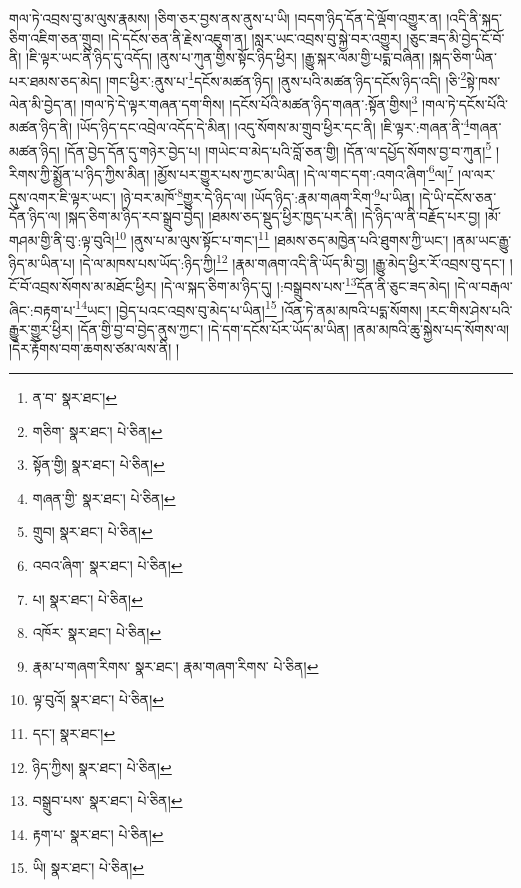 གལ་ཏེ་འབྲས་བུ་མ་ལུས་རྣམས། །ཅིག་ཅར་བྱས་ནས་ནུས་པ་ཡི། །བདག་ཉིད་དོན་དེ་ལྡོག་འགྱུར་ན། །འདི་ནི་སྐད་ཅིག་འཇིག་ཅན་གྲུབ། །དེ་དངོས་ཅན་ནི་རྗེས་འཇུག་ན། །སླར་ཡང་འབྲས་བུ་སྐྱེ་བར་འགྱུར། །ཅུང་ཟད་མི་བྱེད་ངོ་བོ་ནི། །ཇི་ལྟར་ཡང་ནི་ཉིད་དུ་འདོད། །ནུས་པ་ཀུན་གྱིས་སྟོང་ཉིད་ཕྱིར། །རྒྱུ་སྐར་ལམ་གྱི་པདྨ་བཞིན། །སྐད་ཅིག་ཡིན་པར་ཐམས་ཅད་མེད། །གང་ཕྱིར་:ནུས་པ་\footnote{ན་བ་  སྣར་ཐང་། }དངོས་མཚན་ཉིད། །ནུས་པའི་མཚན་ཉིད་དངོས་ཉིད་འདི། །ཅི་\footnote{གཅིག་  སྣར་ཐང་།  པེ་ཅིན། }སྟེ་ཁས་ལེན་མི་བྱེད་ན། །གལ་ཏེ་དེ་ལྟར་གཞན་དག་གིས། །དངོས་པོའི་མཚན་ཉིད་གཞན་:སྟོན་གྱིས།\footnote{སྟོན་གྱི།  སྣར་ཐང་།  པེ་ཅིན། } །གལ་ཏེ་དངོས་པོའི་མཚན་ཉིད་ནི། །ཡོད་ཉིད་དང་འབྲེལ་འདོད་དེ་མིན། །འདུ་སོགས་མ་གྲུབ་ཕྱིར་དང་ནི། །ཇི་ལྟར་:གཞན་ནི་\footnote{གཞན་གྱི་  སྣར་ཐང་།  པེ་ཅིན། }གཞན་མཚན་ཉིད། །དོན་བྱེད་དོན་དུ་གཉེར་བྱེད་པ། །གཡེང་བ་མེད་པའི་བློ་ཅན་གྱི། །དོན་ལ་དཔྱོད་སོགས་བྱ་བ་ཀུན།\footnote{གྲུབ།  སྣར་ཐང་།  པེ་ཅིན། } །རིགས་ཀྱི་སྨྱོན་པ་ཉིད་ཀྱིས་མིན། །མྱོས་པར་གྱུར་པས་ཀྱང་མ་ཡིན། །དེ་ལ་གང་དག་:འགའ་ཞིག་\footnote{འབའ་ཞིག་  སྣར་ཐང་།  པེ་ཅིན། }ལ།\footnote{པ།  སྣར་ཐང་།  པེ་ཅིན། } །ལ་ལར་དུས་འགར་ཇི་ལྟར་ཡང་། །ཉེ་བར་མཁོ་\footnote{འཁོར་  སྣར་ཐང་།  པེ་ཅིན། }གྱུར་དེ་ཉིད་ལ། །ཡོད་ཉིད་:རྣམ་གཞག་རིག་\footnote{རྣམ་པ་གཞག་རིགས་  སྣར་ཐང་། རྣམ་གཞག་རིགས་  པེ་ཅིན། }པ་ཡིན། །དེ་ཡི་དངོས་ཅན་དོན་ཉིད་ལ། །སྐད་ཅིག་མ་ཉིད་རབ་སྒྲུབ་བྱེད། །ཐམས་ཅད་སྡུད་ཕྱིར་ཁྱད་པར་ནི། །དེ་ཉིད་ལ་ནི་བརྗོད་པར་བྱ། །མོ་གཤམ་གྱི་ནི་བུ་:ལྟ་བུའི།\footnote{ལྟ་བུའོ།  སྣར་ཐང་།  པེ་ཅིན། } །ནུས་པ་མ་ལུས་སྟོང་པ་གང་།\footnote{དང་།  སྣར་ཐང་། } །ཐམས་ཅད་མཁྱེན་པའི་ཐུགས་ཀྱི་ཡང་། །ནམ་ཡང་རྒྱུ་ཉིད་མ་ཡིན་པ། །དེ་ལ་མཁས་པས་ཡོད་:ཉིད་ཀྱི།\footnote{ཉིད་ཀྱིས།  སྣར་ཐང་།  པེ་ཅིན། } །རྣམ་གཞག་འདི་ནི་ཡོད་མི་བྱ། །རྒྱུ་མེད་ཕྱིར་རོ་འབྲས་བུ་དང་། །ངོ་བོ་འབྲས་སོགས་མ་མཐོང་ཕྱིར། །དེ་ལ་སྐད་ཅིག་མ་ཉིད་དུ། །:བསྒྲུབས་པས་\footnote{བསྒྲུབ་པས་  སྣར་ཐང་།  པེ་ཅིན། }དོན་ནི་ཅུང་ཟད་མེད། །དེ་ལ་བརྒལ་ཞིང་:བརྟག་པ་\footnote{རྟག་པ་  སྣར་ཐང་།  པེ་ཅིན། }ཡང་། །བྱེད་པའང་འབྲས་བུ་མེད་པ་ཡིན།\footnote{ཡི།  སྣར་ཐང་།  པེ་ཅིན། } །འོན་ཏེ་ནམ་མཁའི་པདྨ་སོགས། །རང་གིས་ཤེས་པའི་རྒྱུར་གྱུར་ཕྱིར། །དོན་གྱི་བྱ་བ་བྱེད་ནུས་ཀྱང་། །དེ་དག་དངོས་པོར་ཡོད་མ་ཡིན། །ནམ་མཁའི་ཆུ་སྐྱེས་པད་སོགས་ལ། །དེར་རྟོགས་བག་ཆགས་ཙམ་ལས་ནི། །
